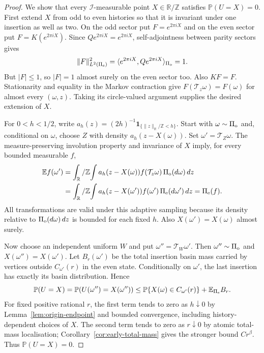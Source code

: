 \documentclass[11pt,letterpaper]{article}
\newcommand{\PP}{\mathbb P}\newcommand{\EE}{\mathbb E}
\newcommand{\T}{\mathbb R/\mathbb Z}\newcommand{\Leb}{\operatorname{Leb}}
\newcommand{\ind}{\mathbf 1}\newcommand{\Exp}{\operatorname{Exp}}
\begin{document}
\begin{proof}
We show that every $\mathcal I$-measurable point $X\in\T$ satisfies
$\PP(U=X)=0$. First extend $X$ from odd to even histories so that it
is invariant under one insertion as well as two.
On the odd sector put $F=e^{2\pi iX}$ and on the even sector put
$F=K(e^{2\pi iX})$. Since $Qe^{2\pi iX}=e^{2\pi iX}$,
self-adjointness between parity sectors gives
\[
 \|F\|_{L^2(\Pi_{\rm e})}^2
   =\langle e^{2\pi iX},Qe^{2\pi iX}\rangle_{\Pi_{\rm o}}=1.
\]
But $|F|\le1$, so $|F|=1$ almost surely on the even sector too.
Also $KF=F$. Stationarity and equality in the Markov contraction
give $F(\mathcal T_z\omega)=F(\omega)$ for almost every
$(\omega,z)$. Taking its circle-valued argument supplies the desired
extension of $X$.

For $0<h<1/2$, write
$a_h(z)=(2h)^{-1}\ind_{\{\|z\|_\T<h\}}$.
Start with $\omega\sim\Pi_{\rm o}$ and, conditional on $\omega$,
choose $Z$ with density $a_h(z-X(\omega))$.
Set $\omega'=\mathcal T_Z\omega$.
The measure-preserving involution property and invariance of $X$ imply,
for every bounded measurable $f$,
\begin{align*}
 \EE f(\omega')
 &=\int_\T\!\int a_h(z-X(\omega))f(\mathcal T_z\omega)
                                  \,\Pi_{\rm o}(d\omega)\,dz\\
 &=\int_\T\!\int a_h(z-X(\omega'))f(\omega')
                                  \,\Pi_{\rm e}(d\omega')\,dz
 =\Pi_{\rm e}(f).
\end{align*}
All transformations are valid under this adaptive sampling because
its density relative to $\Pi_{\rm o}(d\omega)\,dz$ is bounded for
each fixed $h$. Also $X(\omega')=X(\omega)$ almost surely.

Now choose an independent uniform $W$ and put
$\omega''=\mathcal T_W\omega'$. Then $\omega''\sim\Pi_{\rm o}$
and $X(\omega'')=X(\omega')$.
Let $B_r(\omega')$ be the total insertion basin mass carried by
vertices outside $C_{\omega'}(r)$ in the even state.
Conditionally on $\omega'$, the last insertion has exactly its
basin distribution. Hence
\begin{equation}\label{eq:adaptive-atom-removal}
 \PP(U=X)=\PP(U(\omega'')=X(\omega''))
 \le \PP\{X(\omega)\in C_{\omega'}(r)\}
            +\EE_{\Pi_{\rm e}} B_r.
\end{equation}
For fixed positive rational $r$, the first term tends to zero as
$h\downarrow0$ by Lemma~\ref{lem:origin-endpoint} and bounded
convergence, including history-dependent choices of $X$.
The second term tends to zero as $r\downarrow0$ by atomic total-mass
localisation; Corollary~\ref{cor:early-total-mass} gives the stronger
bound $C r^\beta$. Thus $\PP(U=X)=0$.


\end{proof}
\end{document}
